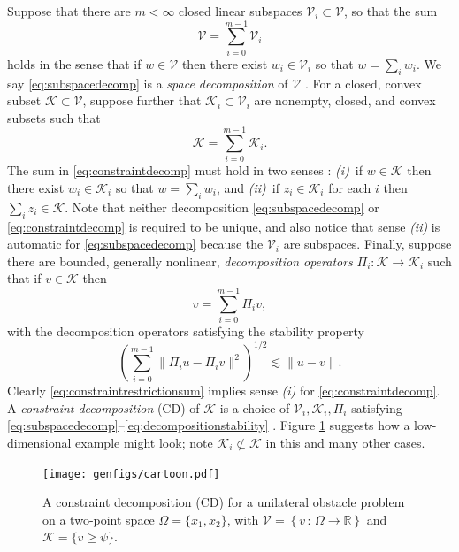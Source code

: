 \documentclass[review,hidelinks,onefignum,onetabnum]{siamart220329}
\newcommand{\RR}{\mathbb{R}}
\newcommand{\cK}{\mathcal{K}}
\newcommand{\cV}{\mathcal{V}}
\begin{document}
Suppose that there are $m<\infty$ closed linear subspaces $\cV_i \subset \cV$, so that the sum
\begin{equation}
\cV = \sum_{i=0}^{m-1} \cV_i \label{eq:subspacedecomp}
\end{equation}
holds in the sense that if $w \in \cV$ then there exist $w_i \in \cV_i$ so that $w = \sum_i w_i$.  We say \eqref{eq:subspacedecomp} is a \emph{space decomposition} of $\cV$ \cite{Xu1992}.  For a closed, convex subset $\cK \subset \cV$, suppose further that $\cK_i \subset \cV_i$ are nonempty, closed, and convex subsets such that
\begin{equation}
\cK = \sum_{i=0}^{m-1} \cK_i. \label{eq:constraintdecomp}
\end{equation}
The sum in \eqref{eq:constraintdecomp} must hold in two senses \cite{TaiTseng2002}: \emph{(i)}~if $w \in \cK$ then there exist $w_i \in \cK_i$ so that $w = \sum_i w_i$, and \emph{(ii)}~if $z_i \in \cK_i$ for each $i$ then $\sum_i z_i \in \cK$.  Note that neither decomposition \eqref{eq:subspacedecomp} or \eqref{eq:constraintdecomp} is required to be unique, and also notice that sense \emph{(ii)} is automatic for \eqref{eq:subspacedecomp} because the $\cV_i$ are subspaces.  Finally, suppose there are bounded, generally nonlinear, \emph{decomposition operators} $\Pi_i : \cK \to \cK_i$ such that if $v \in \cK$ then
\begin{equation}
v = \sum_{i=0}^{m-1} \Pi_i v,  \label{eq:constraintrestrictionsum}
\end{equation}
with the decomposition operators satisfying the stability property
\begin{equation} \label{eq:decompositionstability}
\left(\sum_{i=0}^{m-1} \| \Pi_i u - \Pi_i v \|^2\right)^{1/2} \lesssim \|u - v\|.
\end{equation}
Clearly \eqref{eq:constraintrestrictionsum} implies sense \emph{(i)} for \eqref{eq:constraintdecomp}.  A \emph{constraint decomposition} (CD) of $\cK$ is a choice of $\cV_i,\cK_i,\Pi_i$ satisfying \eqref{eq:subspacedecomp}--\eqref{eq:decompositionstability} \cite{Tai2003}.  Figure \ref{fig:cartoon} suggests how a low-dimensional example might look; note $\cK_i \not\subset \cK$ in this and many other cases.

\begin{figure}[ht]
\centering
\texttt{[image: genfigs/cartoon.pdf]}
\caption{A constraint decomposition (CD) for a unilateral obstacle problem on a two-point space $\Omega=\{x_1,x_2\}$, with $\mathcal{V}=\left\{v \,:\, \Omega \to \RR\right\}$ and $\mathcal{K}=\{v\ge \psi\}$.}
\label{fig:cartoon}
\end{figure}
\end{document}
